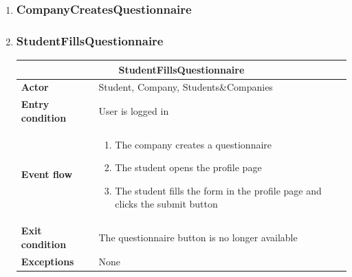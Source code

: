 \begin{enumerate}[label=\textbf{UC\arabic* -}]
\item \subsubsection{CompanyCreatesQuestionnaire}

\item \subsubsection{StudentFillsQuestionnaire}

\begin{table}[H]
    \centering
    \begin{tabular}{|l|m{10cm}|}
        \hline \multicolumn{2}{|c|}{\textbf{StudentFillsQuestionnaire}} \\
        \hline \textbf{Actor} & Student, Company, Students\&Companies \\
        \hline \textbf{Entry condition} & User is logged in \\
        \hline \textbf{Event flow} &
            \begin{enumerate}
                \item The company creates a questionnaire
                \item The student opens the profile page
                \item The student fills the form in the profile page and clicks the submit button
            \end{enumerate} \\
        \hline \textbf{Exit condition} & The questionnaire button is no longer available \\
        \hline \textbf{Exceptions} & None \\
        \hline
    \end{tabular}
\end{table}

\begin{figure}[H]
    \centering
\end{figure}


\end{enumerate}
